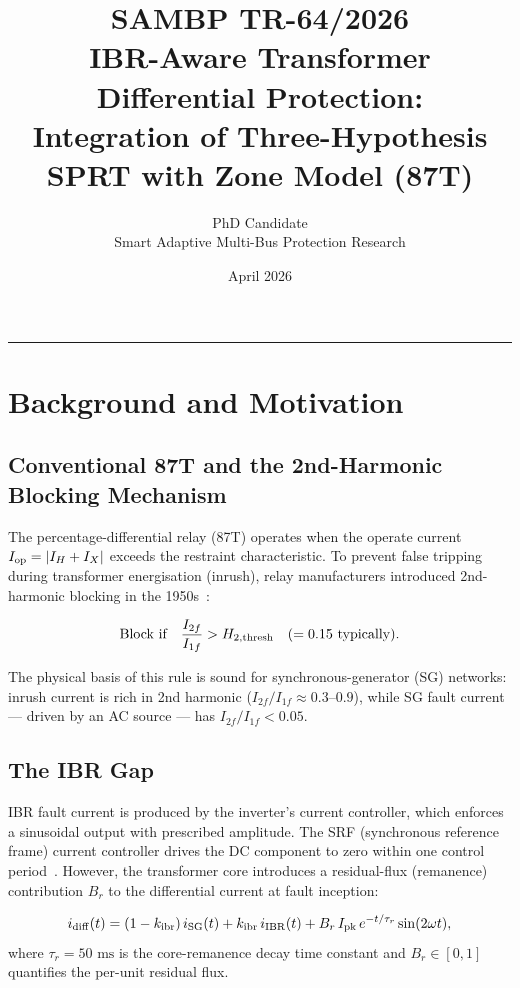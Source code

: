 \documentclass[11pt, a4paper]{article}
\title{\textbf{SAMBP TR-64/2026}\\[4pt]
       \large IBR-Aware Transformer Differential Protection:\\
       Integration of Three-Hypothesis SPRT with Zone Model (87T)}
\author{PhD Candidate\\[2pt]
        \small Smart Adaptive Multi-Bus Protection Research}
\date{April 2026}
\newcommand{\ms}{\,\text{ms}}
\newcommand{\kibr}{k_{\rm ibr}}
\begin{document}
\maketitle
\tableofcontents
\vspace{6pt}\hrule\vspace{10pt}

\section{Background and Motivation}
\label{sec:background}

\subsection{Conventional 87T and the 2nd-Harmonic Blocking Mechanism}

The percentage-differential relay (87T) operates when the operate current
$I_{\rm op} = |I_H + I_X|$ exceeds the restraint characteristic.  To prevent
false tripping during transformer energisation (inrush), relay manufacturers
introduced 2nd-harmonic blocking in the 1950s~\cite{Kennedy1950}:

\begin{equation}
  \text{Block if}\quad
  \frac{I_{2f}}{I_{1f}} > H_{2,\rm thresh} \quad (= 0.15\text{ typically}).
  \label{eq:h2block}
\end{equation}

The physical basis of this rule is sound for synchronous-generator (SG)
networks: inrush current is rich in 2nd harmonic ($I_{2f}/I_{1f} \approx
0.3$--$0.9$), while SG fault current — driven by an AC source — has
$I_{2f}/I_{1f} < 0.05$.

\subsection{The IBR Gap}
\label{sec:ibr_gap}

IBR fault current is produced by the inverter's current controller, which
enforces a sinusoidal output with prescribed amplitude.  The SRF (synchronous
reference frame) current controller drives the DC component to zero within
one control period~\cite{Rocabert2012}.  However, the transformer core
introduces a residual-flux (remanence) contribution $B_r$ to the differential
current at fault inception:

\begin{equation}
  i_{\rm diff}(t) = (1-\kibr)\,i_{\rm SG}(t) + \kibr\,i_{\rm IBR}(t)
                    + B_r\,I_{\rm pk}\,e^{-t/\tau_r}\sin(2\omega t),
  \label{eq:idiff_ibr}
\end{equation}
where $\tau_r = 50\,\ms$ is the core-remanence decay time constant and
$B_r \in [0, 1]$ quantifies the per-unit residual flux.
\end{document}

